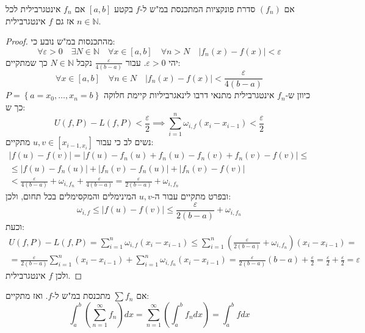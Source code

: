 \documentclass{tstextbook}
\begin{document}
\begin{proposition}
אם \((f_{n})\) סדרת פונקציות המתכנסת במ"ש ל-\(f\) בקטע \([a,b]\) אם \(f_{n}\) אינטגרבילית לכל \(n \in \mathbb{N}\) אז גם \(f\) אינטגרבילית.

\end{proposition}
\begin{proof}
מהתכנסות במ"ש נובע כי:
$$\forall\varepsilon>0\quad \exists N \in \mathbb{N} \quad \forall x \in \left[ a,b\right]\quad \forall n> N\quad \lvert f_{n}(x)-f(x) \rvert <\varepsilon$$
יהי \(\varepsilon>0\). עבור \(\frac{\varepsilon}{4(b-a)}\) נקבל \(N \in \mathbb{N}\) כך שמתקיים:
$$\forall x \in [a,b]\quad  \forall n \in N\quad \lvert f_{n}(x)-f(x) \rvert <\frac{\varepsilon}{4(b-a)}$$
כיוון ש-\(f_{n}\) אינטגרבילית מתנאי דרבו לינאגרביליות קיימת חלוקה \(P=\left\{  a=x_{0},\dots,x_{n}=b  \right\}\) כך ש:
$$U(f,P)-L(f,P)<\frac{\varepsilon}{2}\implies\sum_{i=1}^{n} \omega_{i,f}(x_{i}-x_{i-1})<\frac{\varepsilon}{2}$$
נשים לב כי עבור \(u,v \in [x_{i-1,x_{i}}]\) מתקיים:
$$\begin{gather}\lvert f(u)-f(v) \rvert =\lvert f(u)-f_{n}(u)+f_{n}(u)-f_{n}(v)+f_{n}(v)-f(v) \rvert \leq \\\leq \lvert f(u)-f_{n}(u) \rvert +\lvert f_{n}(v)-f_{n}(u) \rvert +\lvert f_{n}(v)-f(v) \rvert  \\<\frac{\varepsilon}{4(b-a)}+\omega_{i,f_{n}}+\frac{\varepsilon}{4(b-a)}=\frac{\varepsilon}{2(b-a) }+\omega_{i,f_{n}}
\end{gather}$$
ובפרט מתקיים עבור ה-\(u,v\) המינימלים והמקסימלים בכל תחום, ולכן:
$$\omega_{i,f}\leq \lvert f(u)-f(v) \rvert \leq \frac{\varepsilon}{2(b-a)}+\omega_{i,f_{n}}$$
וכעת:
$$\begin{gather}U(f,P)-L(f,P)=\sum_{i=1}^{n}\omega_{i,f}(x_{i}-x_{i-1})\leq\sum_{i=1}^{n} \left( \frac{\varepsilon}{2(b-a)}+\omega_{i, f_{n}} \right)(x_{i}-x_{i-1})=  \\=\frac{\varepsilon}{2(b-a)}\sum_{i=1}^{n}(x_{i}-x_{i-1})+\sum_{i=1}^{n} \omega_{i,f_{n}}(x_{i}-x_{i-1})=\frac{\varepsilon}{2(b-a) }(b-a)+\frac{\varepsilon}{2}=\frac{\varepsilon}{2}+\frac{\varepsilon}{2}=\varepsilon 
\end{gather}$$
ולכן \(f\) אינטגרבילית.

\end{proof}
\begin{proposition}
אם \(\sum f_n\) מתכנסת במ"ש ל-\(f\). ואז מתקיים:
 $$\int_a^b \left(\sum_{n=1}^\infty f_n\right) dx=\sum_{n=1}^\infty \left(\int_a^b f_n dx\right)=\int_a^b f dx$$

\end{proposition}
\end{document}
